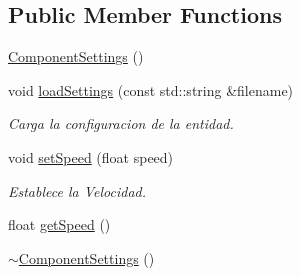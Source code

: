 \subsection*{Public Member Functions}
\begin{DoxyCompactItemize}
\item 
\hyperlink{classant_1_1_component_settings_a656fd2e5c9c2385ccc54aa73387c7c3a}{Component\+Settings} ()
\item 
void \hyperlink{classant_1_1_component_settings_accaca2bae161ce60c84d78817a3864bc}{load\+Settings} (const std\+::string \&filename)
\begin{DoxyCompactList}\small\item\em Carga la configuracion de la entidad. \end{DoxyCompactList}\item 
void \hyperlink{classant_1_1_component_settings_a63c2383733a1a7b51029f055791c5569}{set\+Speed} (float speed)
\begin{DoxyCompactList}\small\item\em Establece la Velocidad. \end{DoxyCompactList}\item 
float \hyperlink{classant_1_1_component_settings_a97dbdc0fd21ce4904c8caaac774d9b93}{get\+Speed} ()
\item 
\hyperlink{classant_1_1_component_settings_aaf467fb092f589167d639172608931f9}{$\sim$\+Component\+Settings} ()
\end{DoxyCompactItemize}
